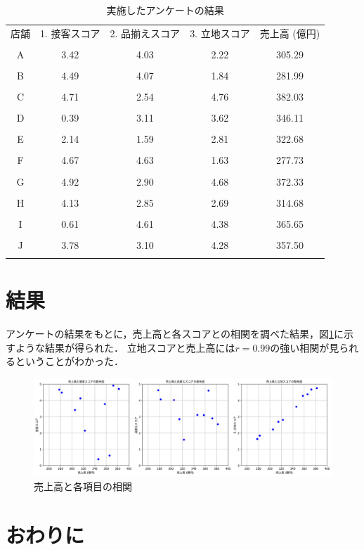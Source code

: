 \documentclass[uplatex]{jsarticle}
\begin{document}
\begin{table}[H]
    \centering
    \caption{実施したアンケートの結果}
    \label{table:anket_result}
    \begin{tabular}{ccccc}
        \hline
        店舗 & 1. 接客スコア & 2. 品揃えスコア & 3. 立地スコア & 売上高 (億円) \\\\ \hline
        A & 3.42 & 4.03 & 2.22 & 305.29 \\\\ \hline
        B & 4.49 & 4.07 & 1.84 & 281.99 \\\\ \hline
        C & 4.71 & 2.54 & 4.76 & 382.03 \\\\ \hline
        D & 0.39 & 3.11 & 3.62 & 346.11 \\\\ \hline
        E & 2.14 & 1.59 & 2.81 & 322.68 \\\\ \hline
        F & 4.67 & 4.63 & 1.63 & 277.73 \\\\ \hline
        G & 4.92 & 2.90 & 4.68 & 372.33 \\\\ \hline
        H & 4.13 & 2.85 & 2.69 & 314.68 \\\\ \hline
        I & 0.61 & 4.61 & 4.38 & 365.65 \\\\ \hline
        J & 3.78 & 3.10 & 4.28 & 357.50 \\\\ \hline
    \end{tabular}
\end{table}

\section{結果}
アンケートの結果をもとに，売上高と各スコアとの相関を調べた結果，図\ref{fig:correlation}に示すような結果が得られた．
立地スコアと売上高には$r=0.99$の強い相関が見られるということがわかった．


\begin{figure}[H]
    \centering
    \includegraphics[width=1\textwidth]{graph/csv_graph.png}
    \caption{売上高と各項目の相関}
    \label{fig:correlation}
\end{figure}


\section{おわりに}
\end{document}
